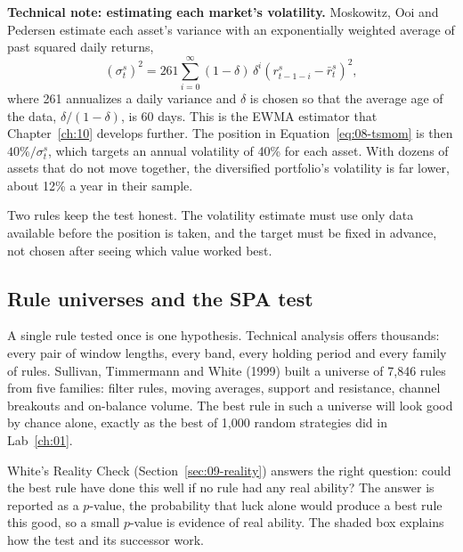 \begin{technote}
\textbf{Technical note: estimating each market's volatility.} Moskowitz, Ooi and Pedersen estimate each asset's variance with an exponentially weighted average of past squared daily returns,
\begin{equation}
  \left(\sigma^s_t\right)^2 = 261 \sum_{i=0}^{\infty} (1-\delta)\,\delta^i \left(r^s_{t-1-i} - \bar r^s_t\right)^2,
  \label{eq:08-ewma}
\end{equation}
where 261 annualizes a daily variance and $\delta$ is chosen so that the average age of the data, $\delta/(1-\delta)$, is 60 days. This is the EWMA estimator that Chapter~\ref{ch:10} develops further. The position in Equation~\eqref{eq:08-tsmom} is then $40\%/\sigma^s_t$, which targets an annual volatility of 40\% for each asset. With dozens of assets that do not move together, the diversified portfolio's volatility is far lower, about 12\% a year in their sample.
\end{technote}

Two rules keep the test honest. The volatility estimate must use only data available before the position is taken, and the target must be fixed in advance, not chosen after seeing which value worked best.

\subsection{Rule universes and the SPA test}

A single rule tested once is one hypothesis. Technical analysis offers thousands: every pair of window lengths, every band, every holding period and every family of rules. Sullivan, Timmermann and White (1999) built a universe of 7,846 rules from five families: filter rules, moving averages, support and resistance, channel breakouts and on-balance volume. The best rule in such a universe will look good by chance alone, exactly as the best of 1,000 random strategies did in Lab~\ref{ch:01}.

White's Reality Check (Section~\ref{sec:09-reality}) answers the right question: could the best rule have done this well if no rule had any real ability? The answer is reported as a $p$-value, the probability that luck alone would produce a best rule this good, so a small $p$-value is evidence of real ability. The shaded box explains how the test and its successor work.


